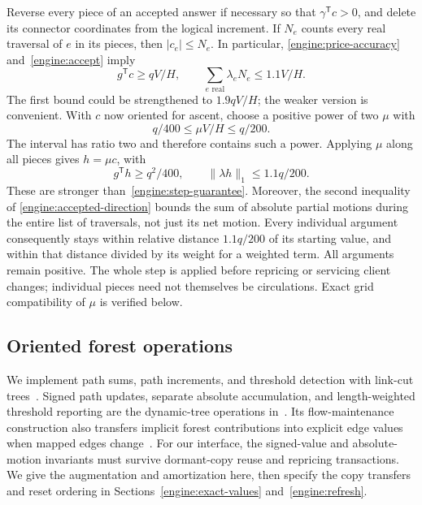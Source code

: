 Reverse every piece of an accepted answer if necessary so that
$\gamma^{\mathsf T}c>0$, and delete its connector coordinates from the
logical increment.  If $N_e$ counts every real
traversal of $e$ in its pieces, then $|c_e|\le N_e$.  In particular,
\eqref{engine:price-accuracy} and~\eqref{engine:accept} imply
\begin{equation}\label{engine:accepted-direction}
       g^{\mathsf T}c\ge qV/H,\qquad
       \sum_{e\text{ real}}\lambda_e N_e\le1.1V/H.
\end{equation}
The first bound could be strengthened to $1.9qV/H$; the weaker version
is convenient.  With $c$ now oriented for ascent, choose a positive power
of two $\mu$ with
\begin{equation}\label{engine:step-scale}
                     q/400\le \mu V/H\le q/200.
\end{equation}
The interval has ratio two and therefore contains such a power.
Applying $\mu$ along all pieces gives $h=\mu c$, with
\[
          g^{\mathsf T}h\ge q^2/400,
          \qquad \|\lambda h\|_1\le1.1q/200.
\]
These are stronger than~\eqref{engine:step-guarantee}.
Moreover, the second inequality of
\eqref{engine:accepted-direction} bounds the sum of absolute partial
motions during the entire list of traversals, not just its net motion.
Every individual argument consequently stays within relative distance
$1.1q/200$ of its starting value, and within that distance divided by its
weight for a weighted term.  All arguments remain positive.  The whole
step is applied before repricing or servicing client changes; individual
pieces need not themselves be circulations.  Exact grid compatibility
of $\mu$ is verified below.

\subsection{Oriented forest operations}\label{engine:dynamic-trees}

We implement path sums, path increments, and threshold detection with
link-cut trees~\cite{DynamicTrees}.  Signed path updates, separate absolute
accumulation, and length-weighted threshold reporting are the dynamic-tree
operations in~\cite[Lemma~2.7]{IncrementalGraphs}.  Its flow-maintenance
construction also transfers implicit forest contributions into explicit
edge values when mapped edges change~\cite[Theorem~3.6]{IncrementalGraphs}.
For our interface, the signed-value and absolute-motion invariants must
survive dormant-copy reuse and repricing transactions.  We give the
augmentation and amortization here, then specify the copy transfers and
reset ordering in Sections~\ref{engine:exact-values} and~\ref{engine:refresh}.

